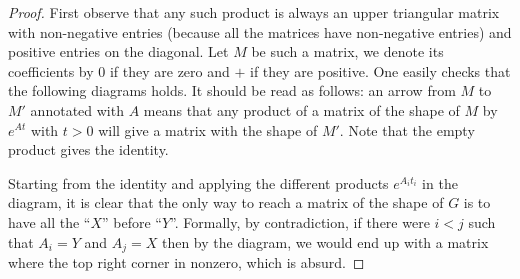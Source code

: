 \begin{proof}
First observe that any such product is always an upper triangular matrix with
non-negative entries (because all the matrices have non-negative entries) and positive
entries on the diagonal. Let $M$ be such a matrix, we denote its coefficients by
$0$ if they are zero and $+$ if they are positive. One easily checks that the following diagrams holds.
It should be read as follows: an arrow from $M$ to $M'$ annotated with $A$ means that any product
of a matrix of the shape of $M$ by $e^{At}$ with $t>0$ will give a matrix with the shape of $M'$.
Note that the empty product gives the identity.
\begin{center}
\end{center}
Starting from the identity and applying the different products $e^{A_it_i}$ in the diagram,
it is clear that the only way to reach a matrix of the shape of $G$ is to have all
the ``$X$'' before ``$Y$''. Formally, by contradiction, if there were $i<j$ such
that $A_i=Y$ and $A_j=X$ then by the diagram, we would end up with a matrix where
the top right corner in nonzero, which is absurd.
\end{proof}

